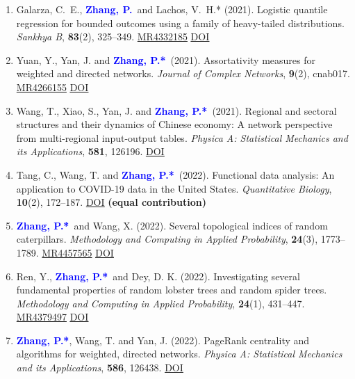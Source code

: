 \documentclass[12pt]{article}
\def\MR#1{\href{http://www.ams.org/mathscinet-getitem?mr=#1}{MR#1}}
\newcommand{\PZ}{\textcolor{blue}{\textbf{Zhang, P.*}}}
\newcommand{\PZnot}{\textcolor{blue}{\textbf{Zhang, P.}}}
\begin{document}
\begin{enumerate}
		\item {\sc Galarza, C.\ E.}, \PZnot\	and {\sc Lachos, V.\ H.*} (2021). Logistic quantile regression for bounded outcomes using a family of heavy-tailed distributions. {\em Sankhya B}, {\bf 83}(2), 325--349. \MR{4332185} 
		\href{https://doi.org/10.1007/s13571-020-00231-0}
		{\underline{DOI}}
		
		\item {\sc Yuan, Y., Yan, J.} and \PZ\ (2021). 
		Assortativity measures for weighted and directed
		networks. \emph{Journal of Complex Networks}, {\bf 9}(2), cnab017. \MR{4266155} \href{https://doi.org/10.1093/comnet/cnab017}
		{\underline{DOI}}
		
		\item {\sc Wang, T., Xiao, S., Yan, J.} and \PZ\ 
		(2021). Regional and sectoral structures and their dynamics of Chinese economy: A network perspective from
		multi-regional input-output tables. {\em Physica A: Statistical Mechanics and its Applications}, {\bf 581}, 126196.	\href{https://doi.org/10.1016/j.physa.2021.126196}
		{\underline{DOI}}
		
		\item {\sc Tang, C., Wang, T.} and \PZ\ (2022). 
		Functional data analysis: An application to COVID-19 data in
		the United States. {\em Quantitative Biology}, {\bf 10}(2), 
		172--187. \href{https://doi.org/10.15302/J-QB-022-0300}
		{\underline{DOI}} {\bf (equal contribution)}
		
		\item \PZ\ and {\sc Wang, X.} (2022). Several 
		topological indices of random caterpillars. 
		{\em Methodology and Computing in Applied Probability}, {\bf 24}(3), 1773--1789. \MR{4457565} 
		\href{https://doi.org/10.1007/s11009-021-09895-1}
		{\underline{DOI}} 
		
		\item {\sc Ren, Y.}, \PZ\ and {\sc Dey, D. K.} (2022). 
		Investigating several fundamental properties of random 
		lobster trees and random spider trees. {\em Methodology and 
		Computing in Applied Probability}, {\bf 24}(1), 431--447. 
		\MR{4379497} \href{https://doi.org/10.1007/s11009-021-09863-9}
		{\underline{DOI}}
		
		\item \PZ, {\sc Wang, T.} and {\sc Yan, J.} (2022). PageRank centrality and algorithms for weighted, directed networks. {\em Physica A: Statistical Mechanics and its Applications}, {\bf 586}, 126438. 
		\href{https://doi.org/10.1016/j.physa.2021.126438}
		{\underline{DOI}}
		

\end{enumerate}
\end{document}

